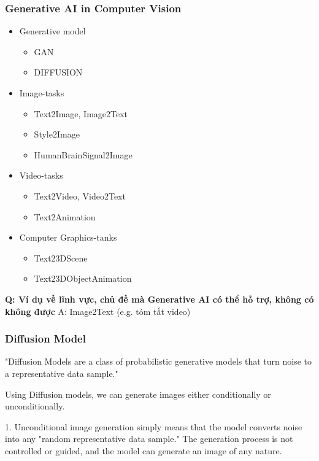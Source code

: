 \subsubsection{Generative AI in Computer Vision}
\begin{itemize}
    \item Generative model
    \begin{itemize}
        \item GAN
        \item DIFFUSION
    \end{itemize}
    \item Image-tasks
    \begin{itemize}
        \item Text2Image, Image2Text
        \item Style2Image
        \item HumanBrainSignal2Image
    \end{itemize}
    \item Video-tasks
    \begin{itemize}
        \item Text2Video, Video2Text
        \item Text2Animation
    \end{itemize}
    \item Computer Graphics-tanks
    \begin{itemize}
        \item Text23DScene
        \item Text23DObjectAnimation
    \end{itemize}
\end{itemize}
\textbf{Q: Ví dụ về lĩnh vực, chủ đề mà Generative AI có thể hỗ trợ, không có không được}
A: Image2Text (e.g. tóm tắt video)



\subsubsection{Diffusion Model}


"Diffusion Models are a class of probabilistic generative models that turn noise to a representative data sample."

Using Diffusion models, we can generate images either conditionally or unconditionally.

1. Unconditional image generation simply means that the model converts noise into any "random representative data sample." The generation process is not controlled or guided, and the model can generate an image of any nature.


